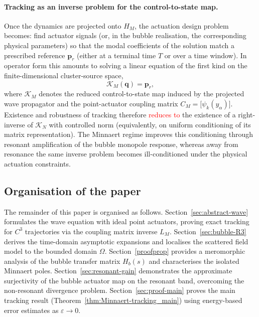 \documentclass[11pt,a4paper]{article}
\numberwithin{equation}{section}
\begin{document}
\paragraph{Tracking as an inverse problem for the control-to-state map.}
Once the dynamics are projected onto $H_M$, the actuation design problem becomes: find actuator signals (or, in the bubble realisation, the corresponding physical parameters) so that the modal coefficients of the solution match a prescribed reference $\bm p_r$ (either at a terminal time $T$ or over a time window). In operator form this amounts to solving a linear equation of the first kind on the finite-dimensional cluster-source space,
\[
 \mathcal{K}_M(\bm q)=\bm p_r,
\]
where $\mathcal{K}_M$ denotes the reduced control-to-state map induced by the projected wave propagator and the point-actuator coupling matrix $C_M=\big[\psi_k(y_\alpha)\big]$. Existence and robustness of tracking therefore \textcolor{red}{reduces to} the existence of a right-inverse of $\mathcal{K}_N$ with controlled norm (equivalently, on uniform conditioning of its matrix representation). The Minnaert regime improves this conditioning through resonant amplification of the bubble monopole response, whereas away from resonance the same inverse problem becomes ill-conditioned under the physical actuation constraints.

\subsection*{Organisation of the paper}
\noindent
The remainder of this paper is organised as follows. Section~\ref{sec:abstract-wave} formulates the wave equation with ideal point actuators, proving exact tracking for $C^3$ trajectories via the coupling matrix inverse $L_M$. Section~\ref{sec:bubble-R3} derives the time-domain asymptotic expansions and localises the scattered field model to the bounded domain $\Omega$. Section~\ref{proofprop} provides a meromorphic analysis of the bubble transfer matrix $H_b(s)$ and characterises the isolated Minnaert poles. Section~\ref{sec:resonant-gain} demonstrates the approximate surjectivity of the bubble actuator map on the resonant band, overcoming the non-resonant divergence problem. Section~\ref{sec:proof-main} proves the main tracking result (Theorem~\ref{thm:Minnaert-tracking_main}) using energy-based error estimates as $\varepsilon \to 0$. %
\end{document}
